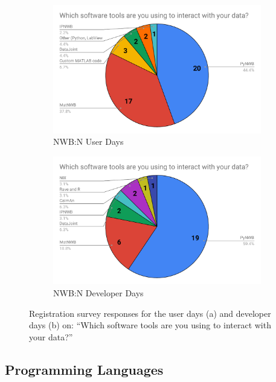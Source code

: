 \documentclass{article}
\begin{document}
\begin{figure}[h!]
   \begin{subfigure}[b]{0.49\textwidth}
        \includegraphics[width=\textwidth]{figures/users_nwb_software_presurvey.pdf}
        \caption{NWB:N User Days}
    \end{subfigure}
    \begin{subfigure}[b]{0.49\textwidth}
        \includegraphics[width=\textwidth]{figures/developers_nwb_software_presurvey.pdf}
        \caption{NWB:N Developer Days}
    \end{subfigure}
    \caption{Registration survey responses for the user days (a) and developer days (b) on: ``Which software tools are you using to interact with your data?''}
\end{figure}

\vspace{-0.2cm}
\subsection{Programming Languages}
\end{document}
